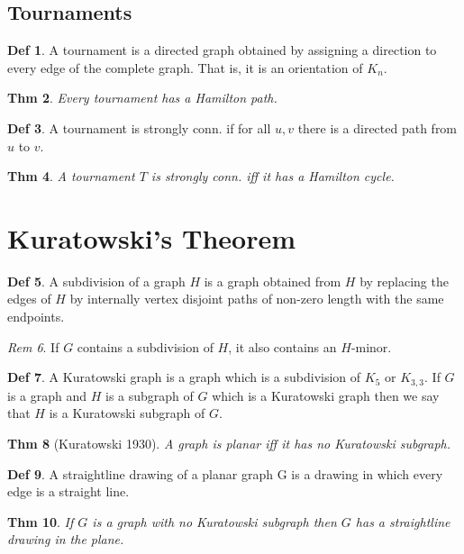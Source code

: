 \documentclass[11pt, fleqn, a4paper, landscape]{article}
\theoremstyle{plain} %
\newtheorem{thm}{Thm}
\theoremstyle{remark} %
\newtheorem{rem}[thm]{Rem}
\theoremstyle{definition} %
\newtheorem{defi}[thm]{Def}
\begin{document}
\begin{multicols}{5}
\subsection{Tournaments}
\begin{defi}
A tournament is a directed graph obtained by assigning a direction to every
edge of the complete graph. That is, it is an orientation of $K_n$.
\end{defi}

\begin{thm}
Every tournament has a Hamilton path.
\end{thm}

\begin{defi}
A tournament is strongly conn. if for all $u, v$ there is a directed path from $u$ to $v$.
\end{defi}
\begin{thm}
A tournament $T$ is strongly conn. iff it has a Hamilton cycle.
\end{thm}

\section{Kuratowski’s Theorem}

\begin{defi}
A subdivision of a graph $H$ is a graph obtained from $H$ by replacing the edges of $H$ by internally vertex disjoint paths of non-zero length with the same endpoints.
\end{defi}
\addtocounter{thm}{1}
\begin{rem}
If $G$ contains a subdivision of $H$, it also contains an $H$-minor.
\end{rem}

\begin{defi}
A Kuratowski graph is a graph which is a subdivision of $K_5$ or $K_{3,3}$. If $G$ is a graph and $H$ is a subgraph of $G$ which is a Kuratowski graph then we say that $H$ is a Kuratowski subgraph of $G$.
\end{defi}

\begin{thm}[Kuratowski 1930]
A graph is planar iff it has no Kuratowski subgraph.
\end{thm}

\begin{defi}
A straightline drawing of a planar graph G is a drawing in which every edge is a straight line.
\end{defi}

\begin{thm}
If $G$ is a graph with no Kuratowski subgraph then $G$ has a straightline drawing in the plane.
\end{thm}


\end{multicols}
\end{document}

